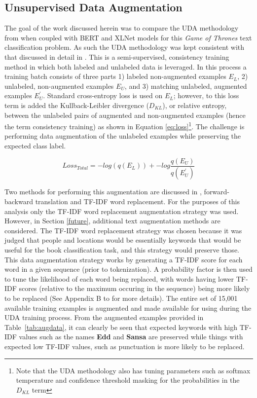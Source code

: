 \documentclass[twoside,twocolumn,10pt]{article}
\begin{document}
 \subsection{Unsupervised Data Augmentation}
The goal of the work discussed herein was to compare the UDA methodology from \cite{Xie:2019} when coupled with BERT and XLNet models for this {\it Game of Thrones} text classification problem. As such the UDA methodology was kept consistent with that discussed in detail in \cite{Xie:2019}. This is a semi-supervised, consistency training method in which both labeled and unlabeled data is leveraged. In this process a training batch consists of three parts 1) labeled non-augmented examples $E_{L}$, 2) unlabeled, non-augmented examples $E_{U}$, and 3) matching unlabeled, augmented examples $E^{\prime}_{U}$. Standard cross-entropy loss is used on $E_{L}$; however, to this loss term is added the Kullback-Leibler divergence ($D_{KL}$), or relative entropy, between the unlabeled pairs of augmented and non-augmented examples (hence the term consistency training) as shown in Equation \ref{eq:loss}\footnote{Note that the UDA methodology also has tuning parameters such as softmax temperature and confidence threshold masking for the probabilities in the $D_{KL}$ term}. The challenge is performing data augmentation of the unlabeled examples while preserving the expected class label.

 \begin{equation}
 \label{eq:loss}
 Loss_{Total} = -log(q(E_{L})) + -log\frac{q(E_{U})}{q(E^{\prime}_{U})}
 \end{equation}

Two methods for performing this augmentation are discussed in \cite{Xie:2019}, forward-backward translation and TF-IDF word replacement. For the purposes of this analysis only the TF-IDF word replacement augmentation strategy was used. However, in Section \ref{future}, additional text augmentation methods are considered. The TF-IDF word replacement strategy was chosen because it was judged that people and locations would be essentially keywords that would be useful for the book classification task, and this strategy would preserve those. This data augmentation strategy works by generating a TF-IDF score for each word in a given sequence (prior to tokenization). A probability factor is then used to tune the likelihood of each word being replaced, with words having lower TF-IDF scores (relative to the maximum occuring in the sequence) being more likely to be replaced (See Appendix B to \cite{Xie:2019} for more details).  The entire set of  15,001 available training examples is augmented and made available for using during the UDA training process. From the augmented examples provided in Table~\ref{tab:augdata}, it can clearly be seen that expected keywords with high TF-IDF values such as the names \textbf{Edd} and \textbf{Sansa} are preserved while things with expected low TF-IDF values, such as punctuation is more likely to be replaced.  
\end{document}
